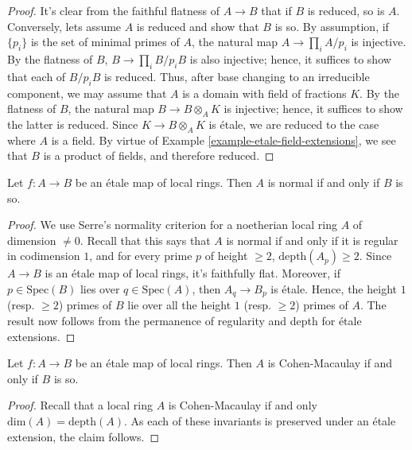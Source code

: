 \begin{proof}
It's clear from the faithful flatness of $A \to B$ that if $B$ is reduced, so
is $A$. Conversely, lets assume $A$ is reduced and show that $B$ is so. By
assumption, if $\{p_i\}$ is the set of minimal primes of $A$, the natural map
$A \to \prod_i A/p_i$ is injective. By the flatness of $B$,
$B \to \prod_i B/p_iB$ is also injective; hence, it suffices to show that each
of $B/p_iB$ is reduced. Thus, after base changing to an irreducible component,
we may assume that $A$ is a domain with field of fractions $K$. By the
flatness of $B$, the natural map $B \to B \otimes_A K$ is injective; hence,
it suffices to show the latter is reduced. Since $K \to B \otimes_A K$ is
\'etale, we are reduced to the case where $A$ is a field. By virtue of
Example \ref{example-etale-field-extensions}, we see that $B$ is a product of 
fields,
and therefore reduced.
\end{proof}


\begin{proposition}
\label{proposition-etale-normal}
Let $f:A \to B$ be an \'etale map of local rings. Then $A$ is normal if and
only if $B$ is so.
\end{proposition}

\begin{proof}
We use Serre's normality criterion for a noetherian local ring $A$ of
dimension $\neq 0$. Recall that this says that $A$ is normal if and only if
it is regular in codimension $1$, and for every prime $p$ of height $\geq 2$,
$\mathrm{depth}(A_p) \geq 2$. Since $A \to B$ is an \'etale map of local
rings, it's faithfully flat. Moreover, if $p \in \text{Spec}(B)$ lies over
$q \in \text{Spec}(A)$, then $A_q \to B_p$ is \'etale. Hence, the height $1$
(resp. $\geq 2$) primes of $B$ lie over all the height $1$ (resp. $\geq 2$)
primes of $A$. The result now follows from the permanence of regularity and
depth for \'etale extensions.
\end{proof}

\begin{proposition}
\label{proposition-etale-CM}
Let $f:A \to B$ be an \'etale map of local rings. Then $A$ is Cohen-Macaulay
if and only if $B$ is so.
\end{proposition}
\begin{proof}
Recall that a local ring $A$ is Cohen-Macaulay if and only
$\mathrm{dim}(A) = \mathrm{depth}(A)$. As each of these invariants is
preserved under an \'etale extension, the claim follows.
\end{proof}

